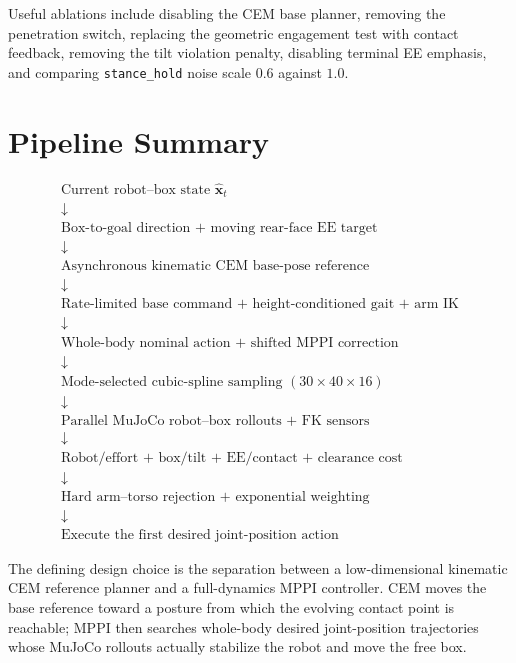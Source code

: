 \documentclass[11pt,a4paper]{article}
\newcommand{\code}[1]{\texttt{#1}}
\begin{document}
Useful ablations include disabling the CEM base planner, removing the
penetration switch, replacing the geometric engagement test with contact
feedback, removing the tilt violation penalty, disabling terminal EE
emphasis, and comparing \code{stance\_hold} noise scale $0.6$ against $1.0$.

\section{Pipeline Summary}

\begin{equation*}
\boxed{
\begin{array}{c}
\text{Current robot--box state }\hat{\bm{x}}_t\\
\downarrow\\
\text{Box-to-goal direction + moving rear-face EE target}\\
\downarrow\\
\text{Asynchronous kinematic CEM base-pose reference}\\
\downarrow\\
\text{Rate-limited base command + height-conditioned gait + arm IK}\\
\downarrow\\
\text{Whole-body nominal action + shifted MPPI correction}\\
\downarrow\\
\text{Mode-selected cubic-spline sampling }(30\times40\times16)\\
\downarrow\\
\text{Parallel MuJoCo robot--box rollouts + FK sensors}\\
\downarrow\\
\text{Robot/effort + box/tilt + EE/contact + clearance cost}\\
\downarrow\\
\text{Hard arm--torso rejection + exponential weighting}\\
\downarrow\\
\text{Execute the first desired joint-position action}
\end{array}}
\end{equation*}

The defining design choice is the separation between a low-dimensional
kinematic CEM reference planner and a full-dynamics MPPI controller. CEM moves
the base reference toward a posture from which the evolving contact point is
reachable; MPPI then searches whole-body desired joint-position trajectories
whose MuJoCo rollouts actually stabilize the robot and move the free box.
\end{document}
